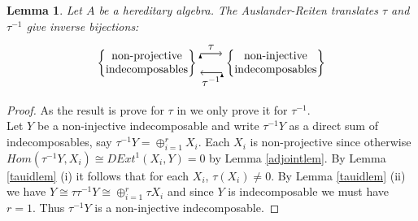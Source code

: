 \documentclass[11.5pt, twoside, a4paper, titlepage]{report}
\makeatletter
\theoremstyle{definition}
\theoremstyle{plain}
\newtheorem{lem}[mydef]{Lemma}
\newcommand{\mytab}[1]{%
\begin{tabular}{@{}c@{}}
#1
\end{tabular}
}
\makeatother
\begin{document}
\begin{lem} \label{taubijectionlem}
Let $A$ be a hereditary algebra. The Auslander-Reiten translates $\tau$ and $\tau^{-1}$ give inverse bijections:
 \begin{equation*}
\begin{tikzpicture}[->,-latex, auto, main path/.style={->, semithick}, main node/.style={}]
\node	[main node]		(2) at (0,0)		{$\left\{\mytab{\text{non-projective}\\ \text{indecomposables}}\right\}$};
\node	[main node]		(3) at (4,0)		{$\left\{\mytab{\text{non-injective}\\ \text{indecomposables}}\right\}$};

\draw (2.10) edge [main path] node [auto] {$\tau$} (3.170);
\draw (3.190) edge [main path] node [auto] {$\tau^{-1}$} (2.350);
\end{tikzpicture}
\end{equation*}
\end{lem}
\begin{proof}
As the result is prove for $\tau$ in \cite{CB2} we only prove it for $\tau^{-1}$.\\
Let $Y$ be a non-injective indecomposable and write $\tau^{-1}Y$ as a direct sum of indecomposables, say $\tau^{-1}Y = \oplus^r_{i=1}X_i$. Each $X_i$ is non-projective since otherwise $Hom(\tau^{-1}Y, X_i)\cong DExt^1(X_i,Y)=0$ by Lemma \ref{adjointlem}. By Lemma \ref{tauidlem} (i) it follows that for each $X_i$, $\tau(X_i)\neq 0$. By Lemma \ref{tauidlem} (ii) we have $Y\cong \tau \tau^{-1}Y \cong \oplus^r_{i=1}\tau X_i$ and since $Y$ is indecomposable we must have $r=1$. Thus $\tau^{-1}Y$ is a non-injective indecomposable.
\end{proof}
\end{document}
